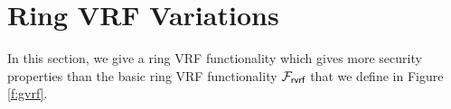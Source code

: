 \section{Ring VRF Variations}
\label{sec:morefuncs}
In this section, we give a ring VRF functionality which gives more security properties than the basic ring VRF functionality $ \mathcal{F}_{\textsf{rvrf}} $ that we define in Figure \ref{f:gvrf}.
%
%		
%			
%			
%			
%	




